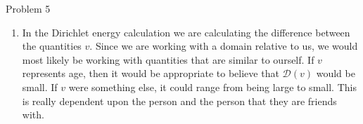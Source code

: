 \begin{problem}{Problem 5}
\begin{Highlight}
        \begin{enumerate}[label = (\alph*), start = 2]
            \item In the Dirichlet energy calculation we are calculating the difference between the quantities $v$. Since we are working with a domain relative to us, we would most likely be working with quantities
            that are similar to ourself. If $v$ represents age, then it would be appropriate to believe that $\mathcal{D}(v)$ would be small. If $v$ were something else, it could range from being large to small.
            This is really dependent upon the person and the person that they are friends with.
        \end{enumerate}
    \end{Highlight}
\end{problem}

